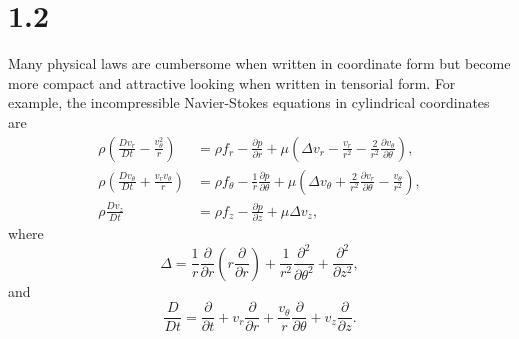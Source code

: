\section{1.2}
\label{sec:1.2}


\begin{rem}
  Many physical laws are cumbersome
  when written in coordinate form
  but become more compact and attractive looking
  when written in tensorial form.
  For example,
  the incompressible Navier-Stokes equations in cylindrical coordinates are
  \begin{align*}
    \rho\left(\frac{Dv_r}{Dt}-\frac{v_{\theta}^2}{r}\right) &= \rho f_r-\frac{\partial p}{\partial r} + \mu\left(\Delta v_r-\frac{v_r}{r^2}-\frac{2}{r^2}\frac{\partial v_{\theta}}{\partial \theta}\right), \\
    \rho\left(\frac{Dv_{\theta}}{Dt}+\frac{v_rv_{\theta}}{r}\right) &= \rho f_{\theta}-\frac{1}{r}\frac{\partial p}{\partial\theta} + \mu\left(\Delta v_{\theta}+\frac{2}{r^2}\frac{\partial v_r}{\partial\theta}-\frac{v_{\theta}}{r^2}\right), \\
    \rho \frac{Dv_z}{Dt} &= \rho f_z-\frac{\partial p}{\partial z}+\mu\Delta v_z,
  \end{align*}
  where
  \begin{equation*}
    \Delta = \frac{1}{r}\frac{\partial}{\partial r}\left(r \frac{\partial}{\partial r}\right)+\frac{1}{r^2}\frac{\partial^2}{\partial \theta^2}+\frac{\partial^2}{\partial z^2},
  \end{equation*}
  and
  \begin{equation*}
    \frac{D}{Dt} = \frac{\partial}{\partial t}+v_r \frac{\partial}{\partial r}+\frac{v_{\theta}}{r}\frac{\partial}{\partial\theta}+v_z \frac{\partial}{\partial z}.
  \end{equation*}
\end{rem}

